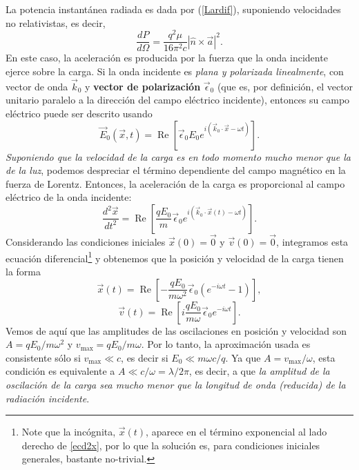 La potencia instantánea radiada es dada por (\ref{Lardif}), suponiendo velocidades no relativistas, es decir, 
\begin{equation}
\frac{dP}{d\Omega}=\frac{q^2\mu}{16\pi^2 c}|\hat{n}\times\vec{a}|^2.
\end{equation}
En este caso, la aceleración es producida por la fuerza que la onda incidente ejerce sobre la carga. Si la onda incidente es \textit{plana y polarizada linealmente}, con vector de onda $\vec{k}_0$ y \textbf{vector de polarización} $\vec{\epsilon}_0$ (que es, por definición, el vector unitario paralelo a la dirección del campo eléctrico incidente), entonces su campo eléctrico puede ser descrito usando
\begin{equation}
\vec{E}_0(\vec{x},t)=\operatorname{Re}\left[
\vec{\epsilon}_0E_0e^{i(\vec{k}_0\cdot\vec{x}-\omega t)}\right] .
\end{equation}
\textit{Suponiendo que la velocidad de la carga es en todo momento mucho menor que la de la luz}, podemos despreciar el término dependiente del campo magnético en la fuerza de Lorentz. Entonces, la aceleración de la carga es proporcional al campo eléctrico de la onda incidente:
\begin{equation}\label{ecd2x}
\frac{d^2\vec{x}}{dt^2}
=\operatorname{Re}\left[\frac{qE_0}{m}\vec{\epsilon}_0e^{i(\vec{k}_0\cdot\vec{x}(t)
-\omega t)}\right] .
\end{equation}
Considerando las condiciones iniciales $\vec{x}(0)=\vec{0}$ y $\vec{v}(0)=\vec{0}$, integramos esta ecuación diferencial\footnote{Note que la incógnita, $\vec{x}(t)$, aparece en el término exponencial al lado derecho de \eqref{ecd2x}, por lo que la solución es, para condiciones iniciales generales, bastante no-trivial.} y obtenemos que la posición y velocidad de la carga tienen la forma
\begin{equation}
\vec{x}(t)
=\operatorname{Re}\left[-\frac{qE_0}{m\omega^2}\vec{\epsilon}_0(e^{-i\omega t}-1)\right] ,
\end{equation}
\begin{equation}
\vec{v}(t)
=\operatorname{Re}\left[i\frac{qE_0}{m\omega}\vec{\epsilon}_0e^{-i\omega t}\right] .
\end{equation}
Vemos de aquí que las amplitudes de las oscilaciones en posición y velocidad son
$A={qE_0}/{m\omega^2}$ y $v_{\max}={qE_0}/{m\omega}$. Por lo
tanto, la aproximación usada es consistente sólo si $v_{\max}\ll c$, es decir si
$E_0\ll {m\omega c}/{q}$. Ya que $A={v_{\max}}/{\omega}$, esta condición
es equivalente a $A\ll c/\omega=\lambda/2\pi$, es decir, a que \textit{la amplitud de la oscilación de la carga sea mucho menor que la longitud de onda (reducida) de la radiación incidente}.

